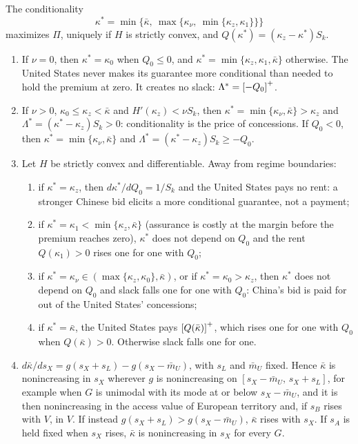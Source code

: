 \begin{proposition}\label{prop:conditionality}
The conditionality
\[ \kappa^*=\min\big\{\bar\kappa,\ \max\{\kappa_\nu,\ \min\{\kappa_z,\kappa_1\}\}\big\} \]
maximizes $\Pi$, uniquely if $H$ is strictly convex, and $Q(\kappa^*)=(\kappa_z-\kappa^*)S_k$.
\begin{enumerate}[label=(\alph*)]
\item If $\nu=0$, then $\kappa^*=\kappa_0$ when $Q_0\le 0$, and $\kappa^*=\min\{\kappa_z,\kappa_1,\bar\kappa\}$ otherwise. The United States never makes its guarantee more conditional than needed to hold the premium at zero. It creates no slack: $\Lambda^*=\left[-Q_0\right]^{+}$.
\item If $\nu>0$, $\kappa_0\le\kappa_z<\bar\kappa$ and $H'(\kappa_z)<\nu S_k$, then $\kappa^*=\min\{\kappa_\nu,\bar\kappa\}>\kappa_z$ and $\Lambda^*=(\kappa^*-\kappa_z)S_k>0$: conditionality is the price of concessions. If $Q_0<0$, then $\kappa^*=\min\{\kappa_\nu,\bar\kappa\}$ and $\Lambda^*=(\kappa^*-\kappa_z)S_k\ge -Q_0$.
\item Let $H$ be strictly convex and differentiable. Away from regime boundaries:
  \begin{enumerate}[label=(\roman*)]
  \item if $\kappa^*=\kappa_z$, then $d\kappa^*/dQ_0=1/S_k$ and the United States pays no rent: a stronger Chinese bid elicits a more conditional guarantee, not a payment;
  \item if $\kappa^*=\kappa_1<\min\{\kappa_z,\bar\kappa\}$ (assurance is costly at the margin before the premium reaches zero), $\kappa^*$ does not depend on $Q_0$ and the rent $Q(\kappa_1)>0$ rises one for one with $Q_0$;
  \item if $\kappa^*=\kappa_\nu\in(\max\{\kappa_z,\kappa_0\},\bar\kappa)$, or if $\kappa^*=\kappa_0>\kappa_z$, then $\kappa^*$ does not depend on $Q_0$ and slack falls one for one with $Q_0$: China's bid is paid for out of the United States' concessions;
  \item if $\kappa^*=\bar\kappa$, the United States pays $\left[Q(\bar\kappa)\right]^{+}$, which rises one for one with $Q_0$ when $Q(\bar\kappa)>0$. Otherwise slack falls one for one.
  \end{enumerate}
\item $d\bar\kappa/ds_X=g(s_X+s_L)-g(s_X-\bar m_U)$, with $s_L$ and $\bar m_U$ fixed. Hence $\bar\kappa$ is nonincreasing in $s_X$ wherever $g$ is nonincreasing on $[s_X-\bar m_U,\,s_X+s_L]$, for example when $G$ is unimodal with its mode at or below $s_X-\bar m_U$, and it is then nonincreasing in the access value of European territory and, if $s_B$ rises with $V$, in $V$. If instead $g(s_X+s_L)>g(s_X-\bar m_U)$, $\bar\kappa$ rises with $s_X$. If $s_A$ is held fixed when $s_X$ rises, $\bar\kappa$ is nonincreasing in $s_X$ for every $G$.
\end{enumerate}
\end{proposition}
